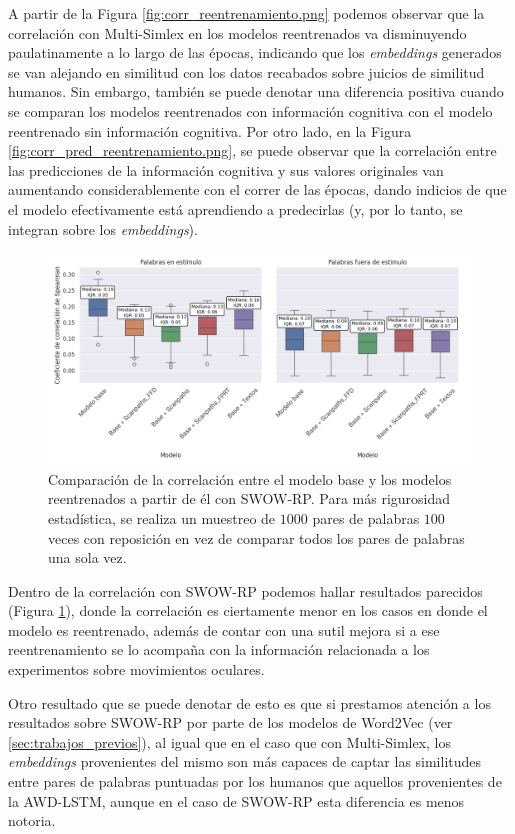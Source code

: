 A partir de la Figura \ref{fig:corr_reentrenamiento.png} podemos observar que la correlación con Multi-Simlex 
en los modelos reentrenados va disminuyendo paulatinamente a lo largo de 
las épocas, indicando que los \textit{embeddings} generados se van alejando en 
similitud con los datos recabados sobre juicios de similitud humanos. 
Sin embargo, también se puede denotar una diferencia positiva cuando se 
comparan los modelos reentrenados con información cognitiva con el modelo 
reentrenado sin información cognitiva. Por otro lado, en la Figura \ref{fig:corr_pred_reentrenamiento.png}, 
se puede observar que la correlación entre las predicciones de la 
información cognitiva y sus valores originales van aumentando 
considerablemente con el correr de las épocas, dando indicios de que 
el modelo efectivamente está aprendiendo a predecirlas (y, por lo tanto, 
se integran sobre los \textit{embeddings}).

\begin{figure}[H]
    \centering
    \includegraphics[width=1\textwidth]{imagenes/swow_lstm.png}
    \caption{Comparación de la correlación entre el modelo base y los modelos reentrenados 
    a partir de él con SWOW-RP. Para más rigurosidad estadística, se realiza un 
    muestreo de $1000$ pares de palabras $100$ veces con reposición en vez de 
    comparar todos los pares de palabras una sola vez.}
    \label{fig:swow_lstm}
\end{figure}

Dentro de la correlación con SWOW-RP podemos hallar resultados parecidos 
(Figura \ref{fig:swow_lstm}), donde la correlación es ciertamente menor en los casos en donde 
el modelo es reentrenado, además de contar con una sutil mejora si a ese 
reentrenamiento se lo acompaña con la información relacionada a los experimentos 
sobre movimientos oculares.

Otro resultado que se puede denotar de esto es que si prestamos atención a 
los resultados sobre SWOW-RP por parte de los modelos de Word2Vec (ver \ref{sec:trabajos_previos}), al igual que en el 
caso que con Multi-Simlex, los \textit{embeddings} provenientes del mismo son más 
capaces de captar las similitudes entre pares de palabras puntuadas por los 
humanos que aquellos provenientes de la AWD-LSTM, aunque en el caso de SWOW-RP 
esta diferencia es menos notoria.

